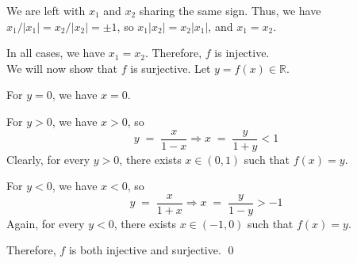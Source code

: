 \documentclass[10pt]{article}
\begin{document}
\begin{enumerate}
                We are left with $x_1$ and $x_2$ sharing the same sign. Thus, we have $x_1 / |x_1| = x_2 / |x_2| = \pm 1$, so $x_1|x_2| = x_2|x_1|$,
                and $x_1 = x_2$.

                In all cases, we have $x_1 = x_2$. Therefore, $f$ is injective. \\
                
                We will now show that $f$ is surjective. Let $y = f(x) \in \mathbb{R}$.
                
                For $y = 0$, we have $x = 0$.
                
                For $y > 0$, we have $x > 0$, so
                \[
                y \;=\; \frac{x}{1-x} \Rightarrow x \;=\; \frac{y}{1+y} < 1 \tag{$1 + y > y > 0$}
                \]
                Clearly, for every $y > 0$, there exists $x \in (0, 1)$ such that $f(x) = y$.

                For $y < 0$, we have $x < 0$, so
                \[
                y \;=\; \frac{x}{1+x} \Rightarrow x \;=\; \frac{y}{1-y} > -1 \tag{$0 > y > y - 1$}
                \]
                Again, for every $y < 0$, there exists $x \in (-1, 0)$ such that $f(x) = y$.

                Therefore, $f$ is both injective and surjective. \qed

        \end{enumerate} 
\end{document}
